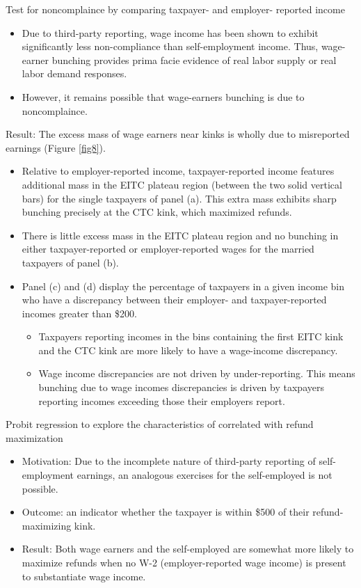 \documentclass[../root]{subfiles}
\begin{document}
    Test for noncomplaince by comparing taxpayer- and employer- reported income
    \begin{itemize}
        \item Due to third-party reporting, wage income has been shown to exhibit significantly less non-compliance than self-employment income. Thus, wage-earner bunching provides prima facie evidence of real labor supply or real labor demand responses. 
        \item However, it remains possible that wage-earners bunching is due to noncomplaince. 
    \end{itemize}
    Result: The excess mass of wage earners near kinks is wholly due to misreported earnings (Figure \ref{fig8}).
    \begin{itemize}
        \item Relative to employer-reported income, taxpayer-reported income features additional mass in the EITC plateau region (between the two solid vertical bars) for the single taxpayers of panel (a). This extra mass exhibits sharp bunching precisely at the CTC kink, which maximized refunds.
        \item There is little excess mass in the EITC plateau region and no bunching in either taxpayer-reported or employer-reported wages for the married taxpayers of panel (b).
        \item Panel (c) and (d) display the percentage of taxpayers in a given income bin who have a discrepancy between their employer- and taxpayer-reported incomes greater than \$200.
        \begin{itemize}
            \item Taxpayers reporting incomes in the bins containing the first EITC kink and the CTC kink are more likely to have a wage-income discrepancy.
            \item Wage income discrepancies are not driven by under-reporting. This means bunching due to wage incomes discrepancies is driven by taxpayers reporting incomes exceeding those their employers report.
        \end{itemize}
    \end{itemize}

    Probit regression to explore the characteristics of correlated with refund maximization
    \begin{itemize}
        \item Motivation: Due to the incomplete nature of third-party reporting of self-employment earnings, an analogous exercises for the self-employed is not possible.
        \item Outcome: an indicator whether the taxpayer is within \$500 of their refund-maximizing kink.
        \item Result: Both wage earners and the self-employed are somewhat more likely to maximize refunds when no W-2 (employer-reported wage income) is present to substantiate wage income.
    \end{itemize}
\end{document}
